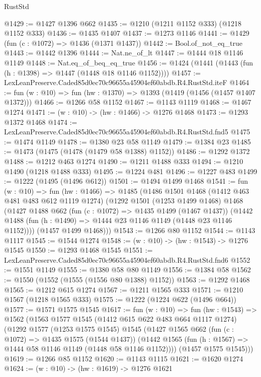 \begin{lexlean}{RustStd}
\begin{coremodule}
@1429 := @1427 @1396 @662
@1435 := @1210 (@1211 @1152 @333) (@1218 @1152 @333)
@1436 := @1435 @1407
@1437 := @1273 @1146
@1441 := @1429 (fun (c : @1072) => @1436 (@1371 @1437))
@1442 := Bool.of_not_eq_true
@1443 := @1442 @1396
@1444 := Nat.ne_of_lt
@1447 := @1444 @18 @1146 @1149
@1448 := Nat.eq_of_beq_eq_true
@1456 := @1424 (@1441 (@1443 (fun (h : @1398) => @1447 (@1448 @18 @1146 @1152))))
@1457 := LexLeanPreserve.Caded85d0ec70c96655a45904ef60abdb.R4.RustStd.iteF
@1464 := fun (w : @10) => fun (hw : @1370) => @1393 (@1419 (@1456 (@1457 @1407 @1372)))
@1466 := @1266 @58 @1152
@1467 := @1143 @1119
@1468 := @1467 @1274
@1471 := (w : @10) -> (hw : @1466) -> @1276 @1468
@1473 := @1293 @1372 @1468
@1474 := LexLeanPreserve.Caded85d0ec70c96655a45904ef60abdb.R4.RustStd.fnd5
@1475 := @1474 @1149
@1478 := @1380 @23 @58 @1149
@1479 := @1384 @23
@1485 := @1473 (@1475 (@1478 (@1479 @58 @1388) @1152))
@1486 := @1292 @1372
@1488 := @1212 @463 @1274
@1490 := @1211 @1488 @333
@1494 := @1210 @1490 (@1218 @1488 @333)
@1495 := @1224 @481
@1496 := @1227 @483
@1499 := @1222 (@1495 (@1496 @612))
@1501 := @1494 @1499 @1468
@1541 := fun (w : @10) =>
  fun (hw : @1466) =>
  @1485
    (@1486
      @1501
      @1468
      (@1412 @463 @481 @483 @612 @1119 @1274)
      (@1292
        @1501
        (@1253 @1499 @1468)
        @1468
        (@1427
          @1488
          @662
          (fun (c : @1072) => @1435 @1499 (@1467 @1437))
          (@1442 @1488 (fun (h : @1490) => @1444 @23 @1146 @1149 (@1448 @23 @1146 @1152))))
        (@1457 @1499 @1468)))
@1543 := @1266 @80 @1152
@1544 := @1143 @1117
@1545 := @1544 @1274
@1548 := (w : @10) -> (hw : @1543) -> @1276 @1545
@1550 := @1293 @1468 @1545
@1551 := LexLeanPreserve.Caded85d0ec70c96655a45904ef60abdb.R4.RustStd.fnd6
@1552 := @1551 @1149
@1555 := @1380 @58 @80 @1149
@1556 := @1384 @58
@1562 := @1550 (@1552 (@1555 (@1556 @80 @1388) @1152))
@1563 := @1292 @1468
@1565 := @1212 @615 @1274
@1567 := @1211 @1565 @333
@1571 := @1210 @1567 (@1218 @1565 @333)
@1575 := @1222 (@1224 @622 (@1496 @664))
@1577 := @1571 @1575 @1545
@1617 := fun (w : @10) =>
  fun (hw : @1543) =>
  @1562
    (@1563
      @1577
      @1545
      (@1412 @615 @622 @483 @664 @1117 @1274)
      (@1292
        @1577
        (@1253 @1575 @1545)
        @1545
        (@1427
          @1565
          @662
          (fun (c : @1072) => @1435 @1575 (@1544 @1437))
          (@1442 @1565 (fun (h : @1567) => @1444 @58 @1146 @1149 (@1448 @58 @1146 @1152))))
        (@1457 @1575 @1545)))
@1619 := @1266 @85 @1152
@1620 := @1143 @1115
@1621 := @1620 @1274
@1624 := (w : @10) -> (hw : @1619) -> @1276 @1621

\end{coremodule}
\end{lexlean}

